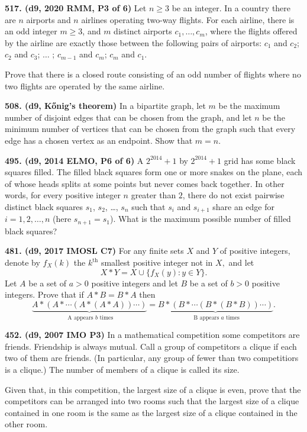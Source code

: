 \documentclass{article}
\begin{document}
\textbf{517. (\color{red}d9\color{black}, 2020 RMM, P3 of 6)} Let $n\ge 3$ be an integer. In a country there are $n$ airports and $n$ airlines operating two-way flights. For each airline, there is an odd integer $m\ge 3$, and $m$ distinct airports $c_1, \dots, c_m$, where the flights offered by the airline are exactly those between the following pairs of airports: $c_1$ and $c_2$; $c_2$ and $c_3$; $\dots$ ; $c_{m-1}$ and $c_m$; $c_m$ and $c_1$.

Prove that there is a closed route consisting of an odd number of flights where no two flights are operated by the same airline.

\textbf{508. (\color{red}d9\color{black}, Kőnig's theorem)} In a bipartite graph, let $m$ be the maximum number of disjoint edges that can be chosen from the graph, and let $n$ be the minimum number of vertices that can be chosen from the graph such that every edge has a chosen vertex as an endpoint. Show that $m=n$.

\textbf{495. (\color{red}d9\color{black}, 2014 ELMO, P6 of 6)} A $2^{2014} + 1$ by $2^{2014} + 1$ grid has some black squares filled. The filled black squares form one or more snakes on the plane, each of whose heads splits at some points but never comes back together. In other words, for every positive integer $n$ greater than $2$, there do not exist pairwise distinct black squares $s_1$, $s_2$, \dots, $s_n$ such that $s_i$ and $s_{i+1}$ share an edge for $i=1,2, \dots, n$ (here $s_{n+1}=s_1$).
\smallbreak
What is the maximum possible number of filled black squares?

\textbf{481. (\color{red}d9\color{black}, 2017 IMOSL C7)} For any finite sets $X$ and $Y$ of positive integers, denote by $f_X(k)$ the $k^{\text{th}}$ smallest positive integer not in $X,$ and let $$X*Y=X\cup \{ f_X(y):y\in Y\}.$$ Let $A$ be a set of $a > 0$ positive integers and let $B$ be a set of $b > 0$ positive integers. Prove that if $A*B=B*A$ then $$\underbrace{A*(A*\cdots (A*(A*A))\cdots )}_{\text{ A appears $b$ times}}=\underbrace{B*(B*\cdots (B*(B*B))\cdots )}_{\text{ B appears $a$ times}}.$$

\textbf{452. (\color{red}d9\color{black}, 2007 IMO P3)} In a mathematical competition some competitors are friends. Friendship is always mutual. Call a group of competitors a clique if each two of them are friends. (In particular, any group of fewer than two competitiors is a clique.) The number of members of a clique is called its size.

Given that, in this competition, the largest size of a clique is even, prove that the competitors can be arranged into two rooms such that the largest size of a clique contained in one room is the same as the largest size of a clique contained in the other room.
\end{document}
